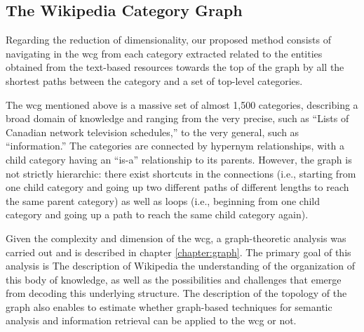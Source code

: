 




\subsection{The Wikipedia Category Graph}

Regarding the reduction of dimensionality, our proposed method consists of navigating in the \gls{wcg} from each category extracted related to the entities obtained from the text-based resources towards the top of the graph by all the shortest paths between the category and a set of top-level categories. 

The \gls{wcg} mentioned above is a massive set of almost  1,500 categories, describing a broad domain of knowledge and ranging from the very precise, such as ``Lists of Canadian network television schedules,” to the very general, such as ``information.” The categories are connected by hypernym relationships, with a child category having an ``is-a” relationship to its parents. However, the graph is not strictly hierarchic: there exist shortcuts in the connections (i.e., starting from one child category and going up two different paths of different lengths to reach the same parent category) as well as loops (i.e., beginning from one child category and going up a path to reach the same child category again).

Given the complexity and dimension of the \gls{wcg}, a graph-theoretic analysis was carried out and is described in chapter \ref{chapter:graph}. The primary goal of this analysis is The description of Wikipedia the understanding of the organization of this body of knowledge, as well as the possibilities and challenges that emerge from decoding this underlying structure. The description of the topology of the graph also enables to estimate whether graph-based techniques for semantic analysis and information retrieval can be applied to the \gls{wcg} or not.
